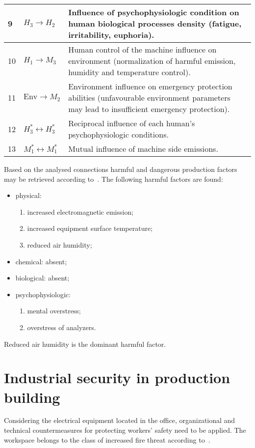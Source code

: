 \begin{longtable}{|p{}|p{}|p{}|}
    9 & $H_3 \rightarrow H_2$ & Influence of psychophysiologic condition on
    human biological processes density (fatigue, irritability, euphoria). \\ \hline 
    10 & $H_1 \rightarrow M_3$ & 
    Human control of the machine influence on environment (normalization of
    harmful emission, humidity and temperature control). \\ \hline
    11 & $\text{Env} \rightarrow M_2$ & Environment influence on emergency
    protection abilities (unfavourable environment parameters may lead to
    insufficient emergency protection). \\ \hline
    12 & $H^*_3 \leftrightarrow H^*_3$ & Reciprocal influence of each human's
    psychophysiologic conditions. \\ \hline
    13 & $M^*_1 \leftrightarrow M^*_1$ & Mutual influence of machine side
    emissions. \\ \hline
\end{longtable}

Based on the analysed connections harmful and dangerous production factors may
be retrieved according to~\cite{gost003}. The following harmful factors are
found:
\begin{itemize}
    \item physical: 
        \begin{enumerate}
            \item increased electromagnetic emission;
            \item increased equipment surface temperature;
            \item reduced air humidity;
        \end{enumerate}
    \item chemical: absent;
    \item biological: absent;
    \item psychophysiologic: 
        \begin{enumerate}
            \item mental overstress;
            \item overstress of analyzers.
        \end{enumerate}
\end{itemize}
Reduced air humidity is the dominant harmful factor.

\section{Industrial security in production building}
Considering the electrical equipment located in the office, organizational and
technical countermeasures for protecting workers' safety need to be applied.
The workspace belongs to the class of increased fire threat according
to~\cite{npaop1-21}.

